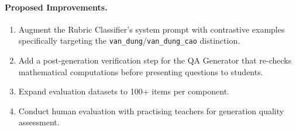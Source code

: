 \documentclass[12pt, a4paper]{article}
\begin{document}
\paragraph{Proposed Improvements.}
\begin{enumerate}[nosep]
    \item Augment the Rubric Classifier's system prompt with contrastive examples specifically targeting the \texttt{van\_dung}/\texttt{van\_dung\_cao} distinction.
    \item Add a post-generation verification step for the QA Generator that re-checks mathematical computations before presenting questions to students.
    \item Expand evaluation datasets to 100+ items per component.
    \item Conduct human evaluation with practising teachers for generation quality assessment.
\end{enumerate}
\end{document}
